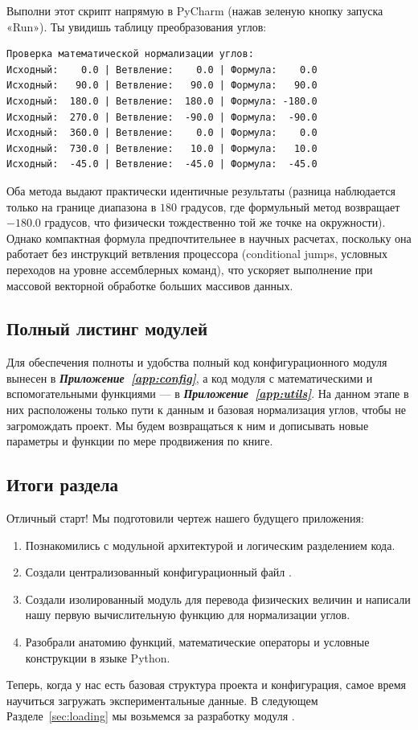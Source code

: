 Выполни этот скрипт напрямую в PyCharm (нажав зеленую кнопку запуска «Run»). Ты увидишь таблицу преобразования углов:
\begin{verbatim}
Проверка математической нормализации углов:
Исходный:    0.0 | Ветвление:    0.0 | Формула:    0.0
Исходный:   90.0 | Ветвление:   90.0 | Формула:   90.0
Исходный:  180.0 | Ветвление:  180.0 | Формула: -180.0
Исходный:  270.0 | Ветвление:  -90.0 | Формула:  -90.0
Исходный:  360.0 | Ветвление:    0.0 | Формула:    0.0
Исходный:  730.0 | Ветвление:   10.0 | Формула:   10.0
Исходный:  -45.0 | Ветвление:  -45.0 | Формула:  -45.0
\end{verbatim}

Оба метода выдают практически идентичные результаты (разница наблюдается только на границе диапазона в $180$ градусов, где формульный метод возвращает $-180.0$ градусов, что физически тождественно той же точке на окружности). Однако компактная формула  предпочтительнее в научных расчетах, поскольку она работает без инструкций ветвления процессора (conditional jumps, условных переходов на уровне ассемблерных команд), что ускоряет выполнение при массовой векторной обработке больших массивов данных.



\subsection{Полный листинг модулей}

Для обеспечения полноты и удобства полный код конфигурационного модуля  вынесен в \textbf{\textit{Приложение~\ref{app:config}}}, а код модуля с математическими и вспомогательными функциями  — в \textbf{\textit{Приложение~\ref{app:utils}}}. На данном этапе в них расположены только пути к данным и базовая нормализация углов, чтобы не загромождать проект. Мы будем возвращаться к ним и дописывать новые параметры и функции по мере продвижения по книге.

\subsection{Итоги раздела}
Отличный старт! Мы подготовили чертеж нашего будущего приложения:
\begin{enumerate}
    \item Познакомились с модульной архитектурой и логическим разделением кода.
    \item Создали централизованный конфигурационный файл .
    \item Создали изолированный модуль  для перевода физических величин и написали нашу первую вычислительную функцию для нормализации углов.
    \item Разобрали анатомию функций, математические операторы и условные конструкции в языке Python.
\end{enumerate}

Теперь, когда у нас есть базовая структура проекта и конфигурация, самое время научиться загружать экспериментальные данные. В следующем Разделе~\ref{sec:loading} мы возьмемся за разработку модуля .
